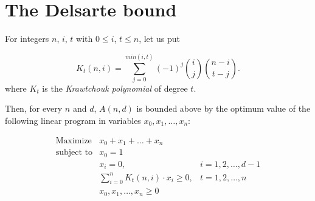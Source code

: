 \section{The Delsarte bound}
\begin{theorem}
    For integers $n$, $i$, $t$ with $0 \leq i$, $t \leq n$, let us put

    \begin{equation}
        K_t(n,i) = \sum_{j=0}^{min(i,t)}(-1)^j{i \choose j}{n - i \choose t - j}.
    \end{equation}
    where $K_t$ is the \emph{Krawtchouk polynomial} of degree $t$.

    Then, for every $n$ and $d$, $A(n,d)$ is bounded above by the optimum value of the following linear program in variables $x_0, x_1, \ldots, x_n$:

    \begin{equation}
        \begin{array}{lll}
            \text{Maximize}   & x_0 + x_1 + \ldots + x_n                       &                  \\
            \text{subject to} & x_0 = 1                                        &                  \\
                              & x_i = 0,                                       & i=1,2,\ldots,d-1 \\
                              & \sum\limits_{i=0}^{n}K_t(n,i) \cdot x_i \geq 0, & t=1,2,\ldots,n   \\
                              & x_0, x_1, \ldots, x_n \geq 0                   &                  \\
        \end{array}
    \end{equation}
\end{theorem}

